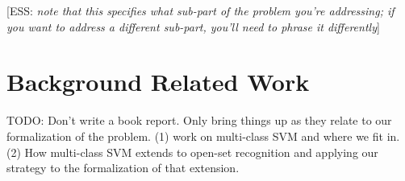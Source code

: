 \documentclass{article}
\newcommand{\elaine}[1]{{\textcolor[rgb]{0.1,0.4,0.6}{[ESS: {\it #1}]}}}
\begin{document}
\elaine{note that this specifies what sub-part of the problem you're addressing; if you want to address a different sub-part, you'll need to phrase it differently}











\section{Background Related Work}

TODO: Don't write a book report. Only bring things up as they relate to our formalization of the problem. (1) work on multi-class SVM and where we fit in. (2) How multi-class SVM extends to open-set recognition and applying our strategy to the formalization of that extension. 
\end{document}
